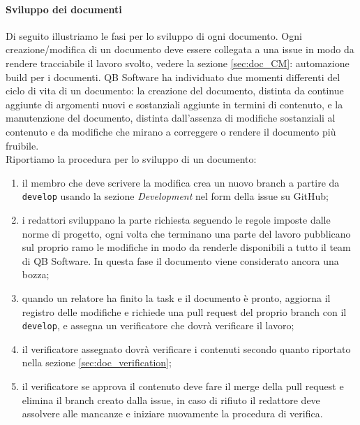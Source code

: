         \paragraph{Sviluppo dei documenti} \label{sec:doc_dev}
            Di seguito illustriamo le fasi per lo sviluppo di ogni documento. Ogni creazione/modifica di un documento deve essere collegata a una issue in modo da rendere tracciabile il lavoro svolto, vedere la sezione \ref{sec:doc_CM}: automazione build per i documenti. QB Software ha individuato due momenti differenti del ciclo di vita di un documento: la creazione del documento, distinta da continue aggiunte di argomenti nuovi e sostanziali aggiunte in termini di contenuto, e la manutenzione del documento, distinta dall'assenza di modifiche sostanziali al contenuto e da modifiche che mirano a correggere o rendere il documento più fruibile.
            \\
            Riportiamo la procedura per lo sviluppo di un documento:
            \begin{enumerate}
                \item il membro che deve scrivere la modifica crea un nuovo branch a partire da \verb|develop| usando la sezione \emph{Development} nel form della issue su GitHub;
                \item i redattori sviluppano la parte richiesta seguendo le regole imposte dalle norme di progetto, ogni volta che terminano una parte del lavoro pubblicano sul proprio ramo le modifiche in modo da renderle disponibili a tutto il team di QB Software. In questa fase il documento viene considerato ancora una bozza;
                \item quando un relatore ha finito la task e il documento è pronto, aggiorna il registro delle modifiche e richiede una pull request del proprio branch con il \verb|develop|, e assegna un verificatore che dovrà verificare il lavoro;
                \item il verificatore assegnato dovrà verificare i contenuti secondo quanto riportato nella sezione \ref{sec:doc_verification};
                \item il verificatore se approva il contenuto deve fare il merge della pull request e elimina il branch creato dalla issue, in caso di rifiuto il redattore deve assolvere alle mancanze e iniziare nuovamente la procedura di verifica.
            \end{enumerate}

